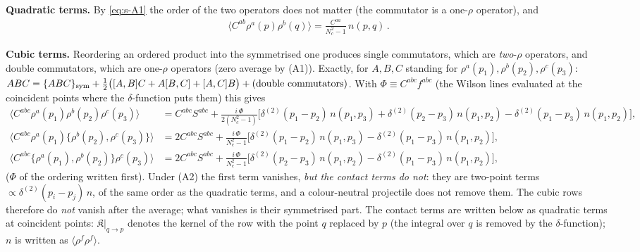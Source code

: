 \documentclass[10pt]{article}
\begin{document}
\noindent\textbf{Quadratic terms.} By \eqref{eq:s-A1} the order of the two operators does not matter (the commutator is a one-$\rho$ operator), and
\begin{align}
\langle C^{ab}\rho^{a}(p)\rho^{b}(q)\rangle=\frac{C^{aa}}{N_{c}^{2}-1}\,n(p,q)\,.\label{eq:s-quad}
\end{align}

\noindent\textbf{Cubic terms.} Reordering an ordered product into the symmetrised one produces single commutators, which are \emph{two}-$\rho$ operators, and double commutators, which are one-$\rho$ operators (zero average by (A1)). Exactly, for $A,B,C$ standing for $\rho^{a}(p_{1}),\rho^{b}(p_{2}),\rho^{c}(p_{3})$: $ABC=\{ABC\}_{\rm sym}+\frac12\big([A,B]C+A[B,C]+[A,C]B\big)+(\text{double commutators})$. With $\Phi\equiv C^{abc}f^{abc}$ (the Wilson lines evaluated at the coincident points where the $\delta$-function puts them) this gives
\begin{align}
\langle C^{abc}\rho^{a}(p_{1})\rho^{b}(p_{2})\rho^{c}(p_{3})\rangle&=C^{abc}S^{abc}+\frac{i\,\Phi}{2(N_{c}^{2}-1)}\Big[\delta^{(2)}(p_{1}-p_{2})\,n(p_{1},p_{3})+\delta^{(2)}(p_{2}-p_{3})\,n(p_{1},p_{2})-\delta^{(2)}(p_{1}-p_{3})\,n(p_{1},p_{2})\Big],\label{eq:s-ord}\\
\langle C^{abc}\rho^{a}(p_{1})\{\rho^{b}(p_{2}),\rho^{c}(p_{3})\}\rangle&=2C^{abc}S^{abc}+\frac{i\,\Phi}{N_{c}^{2}-1}\Big[\delta^{(2)}(p_{1}-p_{2})\,n(p_{1},p_{3})-\delta^{(2)}(p_{1}-p_{3})\,n(p_{1},p_{2})\Big],\label{eq:s-a23}\\
\langle C^{abc}\{\rho^{a}(p_{1}),\rho^{b}(p_{2})\}\rho^{c}(p_{3})\rangle&=2C^{abc}S^{abc}+\frac{i\,\Phi}{N_{c}^{2}-1}\Big[\delta^{(2)}(p_{2}-p_{3})\,n(p_{1},p_{2})-\delta^{(2)}(p_{1}-p_{3})\,n(p_{1},p_{2})\Big],\label{eq:s-a12}
\end{align}
($\Phi$ of the ordering written first). Under (A2) the first term vanishes, \emph{but the contact terms do not}: they are two-point terms $\propto\delta^{(2)}(p_{i}-p_{j})\,n$, of the same order as the quadratic terms, and a colour-neutral projectile does not remove them. The cubic rows therefore do \emph{not} vanish after the average; what vanishes is their symmetrised part. The contact terms are written below as quadratic terms at coincident points: $\mathfrak{K}\big|_{q\to p}$ denotes the kernel of the row with the point $q$ replaced by $p$ (the integral over $q$ is removed by the $\delta$-function); $n$ is written as $\langle\rho^{f}\rho^{f}\rangle$.
\end{document}
